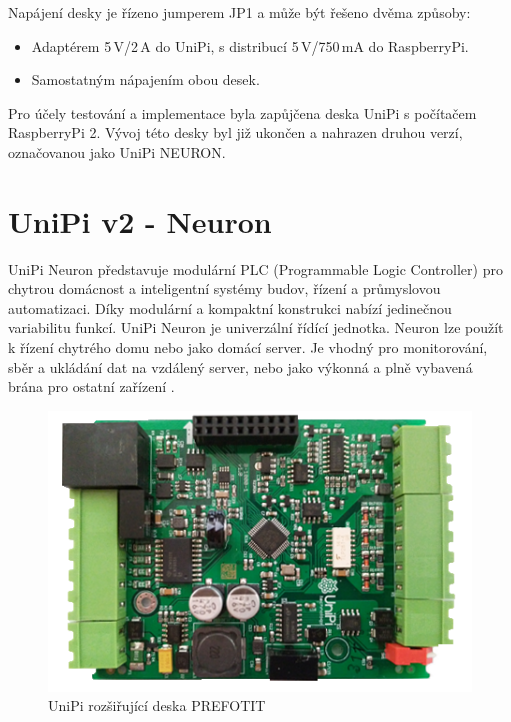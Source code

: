 Napájení desky je řízeno jumperem JP1 a může být řešeno dvěma způsoby:
\begin{itemize}
	\item Adaptérem 5\,V/2\,A do UniPi, s distribucí 5\,V/750\,mA do RaspberryPi.
	\item Samostatným nápajením obou desek.
\end{itemize}


Pro účely testování a implementace byla zapůjčena deska UniPi s počítačem RaspberryPi 2. Vývoj této desky byl již ukončen a nahrazen druhou verzí, označovanou jako UniPi NEURON.




\section{UniPi v2 - Neuron}
\label{KapitolaUnipi2}

UniPi Neuron představuje modulární PLC (Programmable Logic Controller) pro chytrou domácnost a inteligentní systémy budov, řízení a průmyslovou automatizaci. Díky modulární a kompaktní konstrukci nabízí jedinečnou variabilitu funkcí. UniPi Neuron je univerzální řídící jednotka. Neuron lze použít k řízení chytrého domu nebo jako domácí server. Je vhodný pro monitorování, sběr a ukládání dat na vzdálený server, nebo jako výkonná a plně vybavená brána pro ostatní zařízení \cite{UniPiBoard2}.

 \begin{figure}[!ht]
  \begin{center}
    \includegraphics[scale=0.8]{obrazky/unipi_unipi_deska}
  \end{center}
  \caption{UniPi rozšiřující deska \colorbox[rgb]{1,0,0}{PREFOTIT}}
	\label{UnipiV2DeskaUnipi}
\end{figure}

